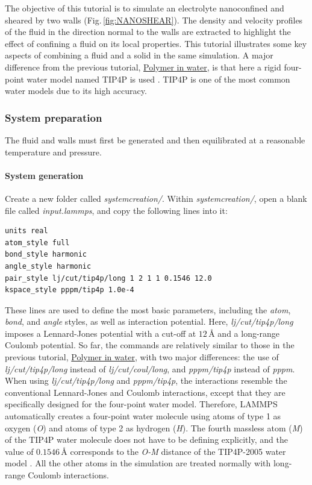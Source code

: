 \documentclass[9pt,tutorial]{livecoms}
\begin{document}
\noindent The objective of this tutorial is to simulate an electrolyte nanoconfined and sheared by two walls (Fig.\,\ref{fig:NANOSHEAR}). The density and velocity profiles of the fluid in the direction normal to the walls are extracted to highlight the effect of confining a fluid on its local properties. This tutorial illustrates some key aspects of combining a fluid and a solid in the same simulation. A major difference from the previous tutorial, \hyperref[all-atoms-label]{Polymer in water}, is that here a rigid four-point water model named TIP4P is used \cite{abascal2005general}. TIP4P is one of the most common water models due to its high accuracy.

\subsubsection{System preparation}
The fluid and walls must first be generated and then equilibrated at a reasonable temperature and pressure.

\paragraph{System generation}
Create a new folder called \textit{systemcreation/}. Within \textit{systemcreation/}, open a blank file called \textit{input.lammps}, and copy the following lines into it:
{\normalsize \begin{verbatim}
units real
atom_style full
bond_style harmonic
angle_style harmonic
pair_style lj/cut/tip4p/long 1 2 1 1 0.1546 12.0
kspace_style pppm/tip4p 1.0e-4
\end{verbatim}}
These lines are used to define the most basic parameters, including the \textit{atom}, \textit{bond}, and \textit{angle} styles, as well as interaction potential. Here, \textit{lj/cut/tip4p/long} imposes a Lennard-Jones potential with a cut-off at $12\,\text{$\text{\AA{}}$}$ and a long-range Coulomb potential. So far, the commands are relatively similar to those in the previous tutorial, \hyperref[all-atoms-label]{Polymer in water}, with two major differences: the use of \textit{lj/cut/tip4p/long} instead of \textit{lj/cut/coul/long}, and \textit{pppm/tip4p} instead of \textit{pppm}. When using \textit{lj/cut/tip4p/long} and \textit{pppm/tip4p}, the interactions resemble the conventional Lennard-Jones and Coulomb interactions, except that they are specifically designed for the four-point water model. Therefore, LAMMPS automatically creates a four-point water molecule using atoms of type 1 as oxygen (\textit{O}) and atoms of type 2 as hydrogen (\textit{H}). The fourth massless atom (\textit{M}) of the TIP4P water molecule does not have to be defining explicitly, and the value of $0.1546\,\text{$\text{\AA{}}$}$ corresponds to the \textit{O-M} distance of the TIP4P-2005 water model \cite{abascal2005general}. All the other atoms in the simulation are treated normally with long-range Coulomb interactions.
\end{document}
